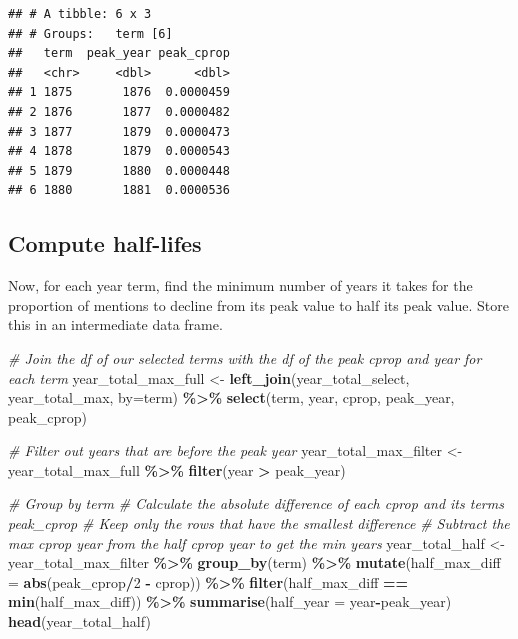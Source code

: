 \documentclass[
]{article}
\newenvironment{Shaded}{\begin{snugshade}}{\end{snugshade}}
\newcommand{\AttributeTok}[1]{\textcolor[rgb]{0.13,0.29,0.53}{#1}}
\newcommand{\CommentTok}[1]{\textcolor[rgb]{0.56,0.35,0.01}{\textit{#1}}}
\newcommand{\DecValTok}[1]{\textcolor[rgb]{0.00,0.00,0.81}{#1}}
\newcommand{\FunctionTok}[1]{\textcolor[rgb]{0.13,0.29,0.53}{\textbf{#1}}}
\newcommand{\NormalTok}[1]{#1}
\newcommand{\OtherTok}[1]{\textcolor[rgb]{0.56,0.35,0.01}{#1}}
\newcommand{\SpecialCharTok}[1]{\textcolor[rgb]{0.81,0.36,0.00}{\textbf{#1}}}
\newcommand{\StringTok}[1]{\textcolor[rgb]{0.31,0.60,0.02}{#1}}
\begin{document}
\begin{verbatim}
## # A tibble: 6 x 3
## # Groups:   term [6]
##   term  peak_year peak_cprop
##   <chr>     <dbl>      <dbl>
## 1 1875       1876  0.0000459
## 2 1876       1877  0.0000482
## 3 1877       1879  0.0000473
## 4 1878       1879  0.0000543
## 5 1879       1880  0.0000448
## 6 1880       1881  0.0000536
\end{verbatim}

\hypertarget{compute-half-lifes}{%
\subsection{Compute half-lifes}\label{compute-half-lifes}}

Now, for each year term, find the minimum number of years it takes for
the proportion of mentions to decline from its peak value to half its
peak value. Store this in an intermediate data frame.

\begin{Shaded}
\begin{Highlighting}[]
\CommentTok{\# Join the df of our selected terms with the df of the peak cprop and year for each term}
\NormalTok{year\_total\_max\_full }\OtherTok{\textless{}{-}} \FunctionTok{left\_join}\NormalTok{(year\_total\_select, year\_total\_max, }\AttributeTok{by=}\StringTok{\textquotesingle{}term\textquotesingle{}}\NormalTok{) }\SpecialCharTok{\%\textgreater{}\%} 
  \FunctionTok{select}\NormalTok{(term, year, cprop, peak\_year, peak\_cprop)}

\CommentTok{\# Filter out years that are before the peak year}
\NormalTok{year\_total\_max\_filter }\OtherTok{\textless{}{-}}\NormalTok{ year\_total\_max\_full }\SpecialCharTok{\%\textgreater{}\%} 
  \FunctionTok{filter}\NormalTok{(year }\SpecialCharTok{\textgreater{}}\NormalTok{ peak\_year)}

\CommentTok{\# Group by term}
\CommentTok{\# Calculate the absolute difference of each cprop and its term\textquotesingle{}s peak\_cprop}
\CommentTok{\# Keep only the rows that have the smallest difference}
\CommentTok{\# Subtract the max cprop year from the half cprop year to get the min years}
\NormalTok{year\_total\_half }\OtherTok{\textless{}{-}}\NormalTok{ year\_total\_max\_filter }\SpecialCharTok{\%\textgreater{}\%}
  \FunctionTok{group\_by}\NormalTok{(term) }\SpecialCharTok{\%\textgreater{}\%} 
  \FunctionTok{mutate}\NormalTok{(}\AttributeTok{half\_max\_diff =} \FunctionTok{abs}\NormalTok{(peak\_cprop}\SpecialCharTok{/}\DecValTok{2} \SpecialCharTok{{-}}\NormalTok{ cprop)) }\SpecialCharTok{\%\textgreater{}\%} 
  \FunctionTok{filter}\NormalTok{(half\_max\_diff }\SpecialCharTok{==} \FunctionTok{min}\NormalTok{(half\_max\_diff)) }\SpecialCharTok{\%\textgreater{}\%} 
  \FunctionTok{summarise}\NormalTok{(}\AttributeTok{half\_year =}\NormalTok{ year}\SpecialCharTok{{-}}\NormalTok{peak\_year)}
\FunctionTok{head}\NormalTok{(year\_total\_half)}
\end{Highlighting}
\end{Shaded}
\end{document}
